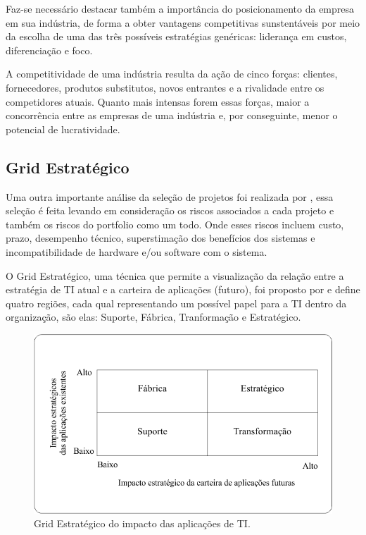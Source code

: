 \documentclass[12pt,a4paper,ruledheader,tocpage=prefix,floatnumber=continuous,pagestart=folhaderosto,font=times]{abnt}
\begin{document}
Faz-se necessário destacar também a importância do posicionamento da empresa em sua indústria, de forma a obter vantagens competitivas sunstentáveis por 
meio da escolha de uma das três possíveis estratégias genéricas: liderança em custos, diferenciação e foco.  

A competitividade de uma indústria resulta da ação de cinco forças: clientes, fornecedores, produtos substitutos, novos entrantes e a rivalidade entre 
os competidores atuais. Quanto mais intensas forem essas forças, maior a concorrência entre as empresas de uma indústria e, por conseguinte, menor o 
potencial de lucratividade.\cite{PORTER1979, PORTER1996} 

\subsection{Grid Estratégico}
Uma outra importante análise da seleção de projetos foi realizada por \cite{McFARLAN1981}, essa seleção é feita levando em consideração os riscos associados
a cada projeto e também os riscos do portfolio como um todo. Onde esses riscos incluem custo, prazo, desempenho técnico, superstimação dos benefícios 
dos sistemas e incompatibilidade de hardware e/ou software com o sistema. 

O Grid Estratégico, uma técnica que permite a visualização da relação entre a estratégia de TI atual e a carteira de aplicações (futuro), foi proposto
por \cite{McFARLAN1981} e define quatro regiões, cada qual representando um possível papel para a TI dentro da organização, são elas: Suporte, Fábrica, 
Tranformação e Estratégico.

\begin{figure}[H]
\centering
\includegraphics[width=.7\textwidth]{img/fig5.png}
\caption{Grid Estratégico do impacto das aplicações de TI\cite{McFARLAN1981}.}
\end{figure} 
\end{document}
